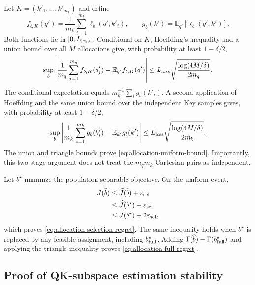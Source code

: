 Let $K=(k'_1,\ldots,k'_{m_k})$ and define
\begin{equation}
 f_{b,K}(q')=\frac1{m_k}\sum_{i=1}^{m_k}\ell_b(q',k'_i),
 \qquad
 g_b(k')=\mathbb E_{q'}[\ell_b(q',k')].
\end{equation}
Both functions lie in $[0,L_{\rm loss}]$.  Conditional on $K$, Hoeffding's
inequality and a union bound over all $M$ allocations give, with probability
at least $1-\delta/2$,
\begin{equation}
 \sup_b\left|
 \frac1{m_q}\sum_{j=1}^{m_q}f_{b,K}(q'_j)
 -\mathbb E_{q'}f_{b,K}(q')
 \right|
 \le
 L_{\rm loss}\sqrt{\frac{\log(4M/\delta)}{2m_q}}.
\end{equation}
The conditional expectation equals
$m_k^{-1}\sum_i g_b(k'_i)$.  A second application of Hoeffding and the same
union bound over the independent Key samples gives, with probability at
least $1-\delta/2$,
\begin{equation}
 \sup_b\left|
 \frac1{m_k}\sum_{i=1}^{m_k}g_b(k'_i)
 -\mathbb E_{k'}g_b(k')
 \right|
 \le
 L_{\rm loss}\sqrt{\frac{\log(4M/\delta)}{2m_k}}.
\end{equation}
The union and triangle bounds prove
\cref{eq:allocation-uniform-bound}.  Importantly, this two-stage argument
does not treat the $m_qm_k$ Cartesian pairs as independent.

Let $b^\star$ minimize the population separable objective.  On the uniform
event,
\begin{align}
 J(\widehat b)
 &\le\widehat J(\widehat b)+\varepsilon_{\rm sel}\\
 &\le\widehat J(b^\star)+\varepsilon_{\rm sel}\\
 &\le J(b^\star)+2\varepsilon_{\rm sel},
\end{align}
which proves \cref{eq:allocation-selection-regret}.
The same inequality holds when $b^\star$ is replaced by any feasible
assignment, including $b_{\rm full}^\star$.  Adding
$\Gamma(\widehat b)-\Gamma(b_{\rm full}^\star)$ and applying the triangle
inequality proves \cref{eq:allocation-full-regret}.

\subsection{Proof of QK-subspace estimation stability}

